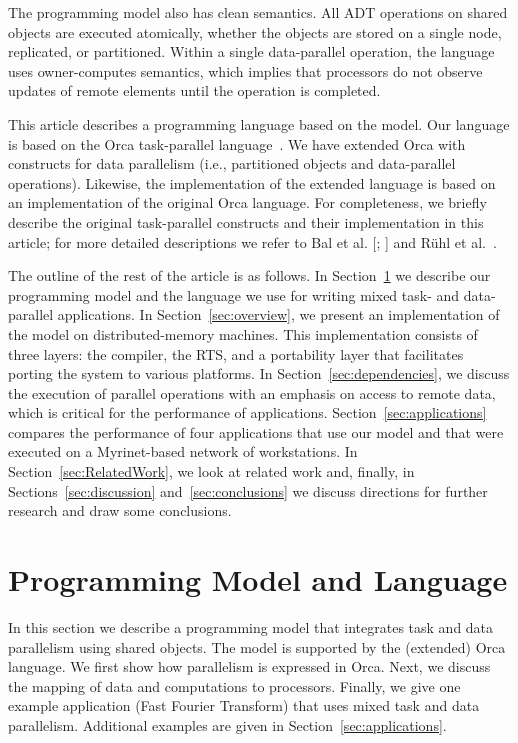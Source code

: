 \documentclass{acmtrans2e}
\begin{document}
The programming model also has clean semantics. All ADT operations on shared
objects are executed atomically, whether the objects are stored on a
single node, replicated, or partitioned.
Within a single data-parallel operation, the language uses owner-computes
semantics, which implies that processors do not observe updates
of remote elements until the operation is completed.

This article describes a programming language based on the model.
Our language is based on the Orca task-parallel
language~\cite{bal92}.  We have extended Orca with constructs
for data parallelism (i.e., partitioned objects and data-parallel
operations).  Likewise, the implementation of the extended language
is based on an implementation of the original Orca
language.  For completeness, we briefly describe the original task-parallel
constructs and their implementation in this article; for more
detailed descriptions we refer to
Bal et al. [; ] and
R\"{u}hl et al.~\citeyear{ruhl96}.

The outline of the rest of the article is as follows.  In
Section~\ref{sec:model} we describe our programming model and the
language we use for writing mixed task- and data-parallel applications.
In Section~\ref{sec:overview}, we present an implementation of the
model on distributed-memory machines. This implementation consists of
three layers: the compiler, the RTS, and a portability layer that
facilitates porting the system to various platforms. In
Section~\ref{sec:dependencies}, we discuss the execution of parallel
operations with an emphasis on access to remote data, which is
critical for the performance of
applications. Section~\ref{sec:applications} compares the performance
of four applications that use our model and that were executed on
a Myrinet-based network of workstations.
In Section~\ref{sec:RelatedWork}, we look at related
work and, finally, in Sections~\ref{sec:discussion}
and~\ref{sec:conclusions} we discuss directions for further research
and draw some conclusions.

\section{Programming Model and Language}
\label{sec:model}

In this section we describe a programming model that integrates
task and data parallelism using shared objects. 
The model is supported by the (extended) Orca language.
We first show how parallelism is expressed in Orca.
Next, we discuss the mapping of data and computations to processors.
Finally, we give one example application (Fast Fourier Transform)
that uses mixed task and data parallelism.
Additional examples are given in Section~\ref{sec:applications}.
\end{document}
